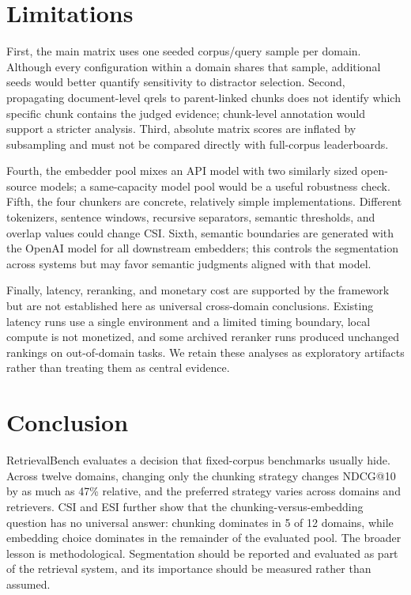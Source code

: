 \documentclass[10pt,letterpaper]{article}
\begin{document}
\section{Limitations}

First, the main matrix uses one seeded corpus/query sample per domain. Although every configuration
within a domain shares that sample, additional seeds would better quantify sensitivity to distractor
selection. Second, propagating document-level qrels to parent-linked chunks does not identify which
specific chunk contains the judged evidence; chunk-level annotation would support a stricter analysis.
Third, absolute matrix scores are inflated by subsampling and must not be compared directly with
full-corpus leaderboards.

Fourth, the embedder pool mixes an API model with two similarly sized open-source models; a
same-capacity model pool would be a useful robustness check. Fifth, the four chunkers are concrete,
relatively simple implementations. Different tokenizers, sentence windows, recursive separators,
semantic thresholds, and overlap values could change CSI. Sixth, semantic boundaries are generated
with the OpenAI model for all downstream embedders; this controls the segmentation across systems
but may favor semantic judgments aligned with that model.

Finally, latency, reranking, and monetary cost are supported by the framework but are not established
here as universal cross-domain conclusions. Existing latency runs use a single environment and a
limited timing boundary, local compute is not monetized, and some archived reranker runs produced
unchanged rankings on out-of-domain tasks. We retain these analyses as exploratory artifacts rather
than treating them as central evidence.

\section{Conclusion}

RetrievalBench evaluates a decision that fixed-corpus benchmarks usually hide. Across twelve
domains, changing only the chunking strategy changes NDCG@10 by as much as 47\% relative, and
the preferred strategy varies across domains and retrievers. CSI and ESI further show that the
chunking-versus-embedding question has no universal answer: chunking dominates in 5 of 12 domains,
while embedding choice dominates in the remainder of the evaluated pool. The broader lesson is
methodological. Segmentation should be reported and evaluated as part of the retrieval system, and
its importance should be measured rather than assumed.
\end{document}

